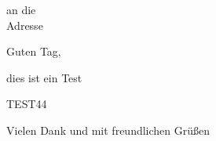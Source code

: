 \documentclass[a4paper,12pt]{scrlttr2}
\begin{document}
\begin{letter}{
an die \\
Adresse\\
}

\opening{Guten Tag,}

dies ist ein Test

TEST44


\closing{Vielen Dank und mit freundlichen Grü\ss en}


\end{letter}
\end{document}

